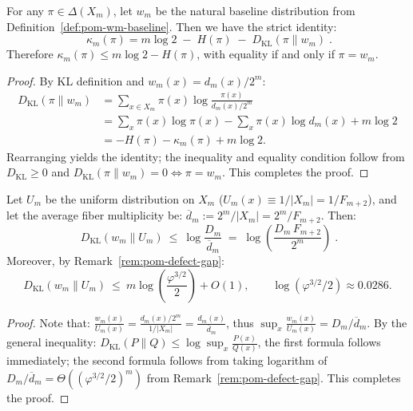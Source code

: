 \begin{proposition}\label{prop:pom-kappa-kl-decomposition}
For any $\pi\in\Delta(X_m)$, let $w_m$ be the natural baseline distribution from Definition~\ref{def:pom-wm-baseline}. Then we have the strict identity:
\[
\boxed{\;
\kappa_m(\pi)=m\log 2\;-\;H(\pi)\;-\;D_{\mathrm{KL}}(\pi\|w_m)\; }.
\]
Therefore $\kappa_m(\pi)\le m\log 2-H(\pi)$, with equality if and only if $\pi=w_m$.
\end{proposition}
\begin{proof}
By KL definition and $w_m(x)=d_m(x)/2^m$:
\[
\begin{aligned}
D_{\mathrm{KL}}(\pi\|w_m)
&=\sum_{x\in X_m}\pi(x)\log\frac{\pi(x)}{d_m(x)/2^m}\\
&=\sum_x\pi(x)\log\pi(x)-\sum_x\pi(x)\log d_m(x)+m\log 2\\
&=-H(\pi)-\kappa_m(\pi)+m\log 2.
\end{aligned}
\]
Rearranging yields the identity; the inequality and equality condition follow from $D_{\mathrm{KL}}\ge 0$ and $D_{\mathrm{KL}}(\pi\|w_m)=0\Leftrightarrow \pi=w_m$. This completes the proof.
\end{proof}

\begin{proposition}\label{prop:pom-wm-kl-to-uniform}
Let $U_m$ be the uniform distribution on $X_m$ ($U_m(x)\equiv 1/|X_m|=1/F_{m+2}$), and let the average fiber multiplicity be:
\(
\overline d_m:=2^m/|X_m|=2^m/F_{m+2}
\).
Then:
\[
\boxed{\;
D_{\mathrm{KL}}(w_m\|U_m)\ \le\ \log\frac{D_m}{\overline d_m}
\;=\;\log\!\left(\frac{D_m\,F_{m+2}}{2^m}\right)\; }.
\]
Moreover, by Remark~\ref{rem:pom-defect-gap}:
\[
D_{\mathrm{KL}}(w_m\|U_m)\ \le\ m\log\!\left(\frac{\varphi^{3/2}}{2}\right)+O(1),
\qquad \log(\varphi^{3/2}/2)\approx 0.0286.
\]
\end{proposition}
\begin{proof}
Note that:
\(
\frac{w_m(x)}{U_m(x)}=\frac{d_m(x)/2^m}{1/|X_m|}=\frac{d_m(x)}{\overline d_m}
\),
thus $\sup_x \frac{w_m(x)}{U_m(x)}=D_m/\overline d_m$. By the general inequality:
\(
D_{\mathrm{KL}}(P\|Q)\le \log \sup_x \frac{P(x)}{Q(x)}
\),
the first formula follows immediately; the second formula follows from taking logarithm of $D_m/\overline d_m=\Theta((\varphi^{3/2}/2)^m)$ from Remark~\ref{rem:pom-defect-gap}. This completes the proof.
\end{proof}

